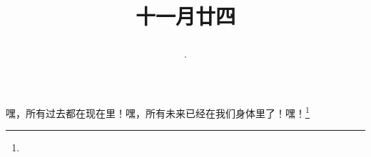 \title{\date[d=5,m=1,y=2024][year:cn-y,年,month:cn,day:cn,日,·,weekday]·十一月廿四 }
嘿，所有过去都在现在里！嘿，所有未来已经在我们身体里了！嘿！\footnote{ }

